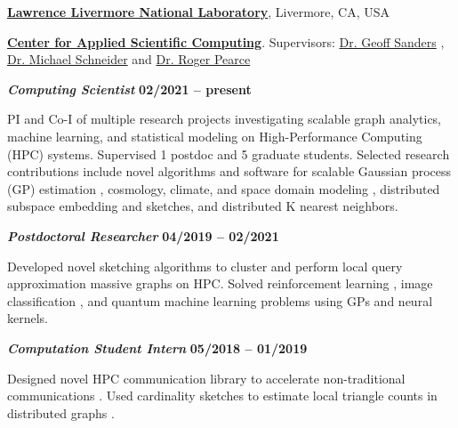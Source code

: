 \href{https://www.llnl.gov/}{\textbf{Lawrence Livermore National Laboratory}},
Livermore, CA, USA

\href{https://computation.llnl.gov/casc/}{\textbf{Center for Applied Scientific Computing}}.
Supervisors:               
\href{https://people.llnl.gov/sanders29}
{Dr. Geoff Sanders}
,
\href{https://pls.llnl.gov/people/staff-bios/physics/schneider-m}
{Dr. Michael Schneider}
and
\href{https://people.llnl.gov/pearce7}
{Dr. Roger Pearce}



\vspace{-0.5em}

\begin{outerlist}

\vspace{-0.5em}

\item[] \textbf{\textit{Computing Scientist}}%
\hfill \textbf{02/2021 -- present}

\vspace{-0.5em}

PI and Co-I of multiple research projects investigating scalable graph analytics, machine learning, and statistical modeling on High-Performance Computing (HPC) systems.
Supervised 1 postdoc and 5 graduate students. 
Selected research contributions include novel algorithms and software for scalable Gaussian process (GP) estimation \cite{muyskens2021muygps}, cosmology, climate, and space domain modeling \cite{muyskens2022star}, distributed subspace embedding and sketches, and distributed K nearest neighbors.

\vspace{-0.5em}

\item[] \textbf{\textit{Postdoctoral Researcher}}%
\hfill \textbf{04/2019 -- 02/2021}

\vspace{-0.5em}

Developed novel sketching algorithms to cluster \cite{priest2020scaling} and perform local query approximation \cite{priest2020degreesketch} massive graphs on HPC.
Solved reinforcement learning \cite{goumiri2020reinforcement}, image classification \cite{goumiri2020star}, and quantum machine learning \cite{otten2020quantum} problems using GPs and neural kernels.

\vspace{-0.5em}

\item[] \textbf{\textit{Computation Student Intern}}%
\hfill \textbf{05/2018 -- 01/2019}

\vspace{-0.5em}

Designed novel HPC communication library to accelerate non-traditional communications \cite{priest2019you}.
Used cardinality sketches to estimate local triangle counts in distributed graphs \cite{priest2018estimating}.

\end{outerlist}
